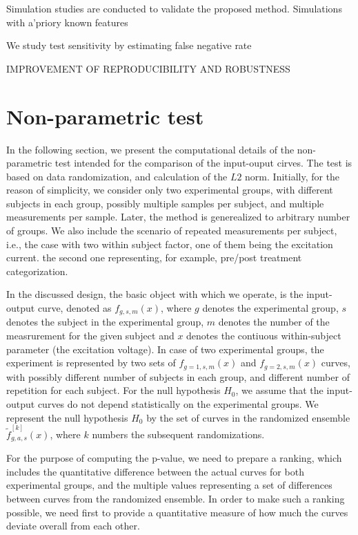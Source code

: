 \documentclass[fleqn,10pt]{wlscirep}
\begin{document}
Simulation studies are conducted to validate the proposed method. 	
Simulations with a'priory known features

We study test sensitivity by estimating false negative rate    

IMPROVEMENT OF REPRODUCIBILITY AND ROBUSTNESS
\section{Non-parametric test}

In the following section, we present the computational details of the non-parametric test intended for the comparison of the input-ouput cirves. The test is based on data randomization, and calculation of the $L2$ norm.
Initially, for the reason of simplicity, we consider only two experimental groups, with different subjects in each group, possibly multiple samples per subject, and multiple measurements per sample. Later, the method is generealized to arbitrary number of groups. We also include the scenario of repeated measurements per subject, i.e., the case with two within subject factor, one of them being the excitation current. the second one representing, for example, pre/post treatment categorization. 

In the discussed design, the basic object with which we operate, is the input-output curve, denoted as $f_{g,s,m}(x)$, where $g$ denotes the experimental group, $s$ denotes the subject in the experimental group, $m$ denotes the number of the measrurement for the given subject and $x$ denotes the contiuous within-subject parameter (the excitation voltage). In case of two experimental groups, the experiment is represented by two sets of $f_{g=1,s,m}(x)$ and $f_{g=2,s,m}(x)$ curves, with possibly different number of subjects in each group, and different number of repetition for each subject. 
For the null hypothesis $H_0$, we assume that the input-output curves do not depend statistically on the experimental groups.  We represent the null hypothesis $H_0$ by the set of curves in the  randomized ensemble $\tilde{f}^{[k]}_{g,a,s}(x)$, where $k$ numbers the subsequent randomizations.

For the purpose of computing the p-value, we need to prepare a ranking, which includes the quantitative difference between the actual curves for both experimental groups, and the multiple values representing a set of differences between curves from the randomized ensemble. 
In order to make such a ranking possible, we need first to provide a quantitative measure of how much the curves deviate overall from each other. 
\end{document}
